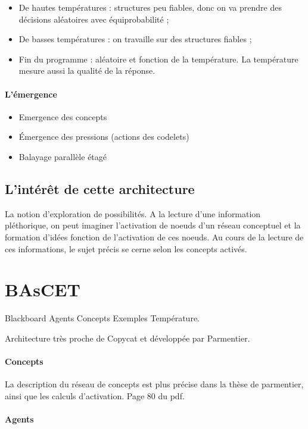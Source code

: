 \documentclass{article}           %
\begin{document}
\begin{itemize}
 \item De hautes températures : structures peu fiables, donc on va prendre des décisions aléatoires avec équiprobabilité ;
 \item De basses températures : on travaille sur des structures fiables ;
 \item Fin du programme : aléatoire et fonction de la température. La température mesure aussi la qualité de la réponse.
\end{itemize}

\paragraph{L'émergence}
\begin{itemize}
 \item Emergence des concepts
 \item Émergence des pressions (actions des codelets)
 \item Balayage parallèle étagé
\end{itemize}


\subsection{L'intérêt de cette architecture}
La notion d'exploration de possibilités. A la lecture d'une information pléthorique, on peut imaginer l'activation de noeuds d'un réseau conceptuel et la formation d'idées fonction de l'activation de ces noeuds. Au cours de la lecture de ces informations, le sujet précis se cerne selon les concepts activés.

\section{BAsCET}
Blackboard Agents Concepts Exemples Température.

Architecture très proche de Copycat et développée par Parmentier.

\paragraph{Concepts}
La description du réseau de concepts est plus précise dans la thèse de parmentier, ainsi que les calculs d'activation. Page 80 du pdf.

\paragraph{Agents}
\end{document}
